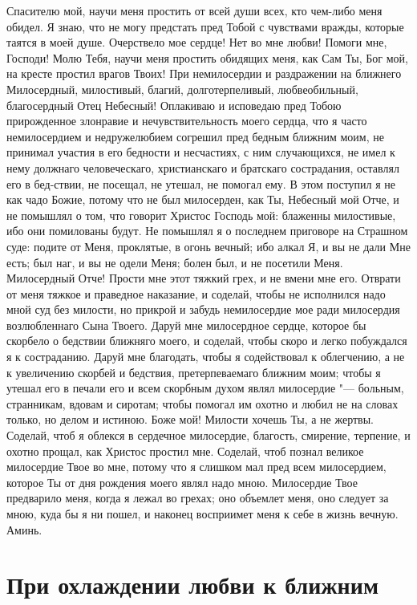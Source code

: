 Спасителю мой, научи меня простить от всей души всех, кто чем-либо меня обидел. Я знаю, что не могу предстать пред Тобой с чувствами вражды, которые таятся в моей душе. Очерствело мое сердце! Нет во мне любви! Помоги мне, Господи! Молю Тебя, научи меня простить обидящих меня, как Сам Ты, Бог мой, на кресте простил врагов Твоих! При немилосердии и раздражении на ближнего Милосердный, милостивый, благий, долготерпеливый, любвеобильный, благосердный Отец Небесный! Оплакиваю и исповедаю пред Тобою прирожденное злонравие и нечувствительность моего сердца, что я часто немилосердием и недружелюбием согрешил пред бедным ближним моим, не принимал участия в его бедности и несчастиях, с ним случающихся, не имел к нему должнаго человеческаго, христианскаго и братскаго сострадания, оставлял его в бед-ствии, не посещал, не утешал, не помогал ему. В этом поступил я не как чадо Божие, потому что не был милосерден, как Ты, Небесный мой Отче, и не помышлял о том, что говорит Христос Господь мой: блаженны милостивые, ибо они помилованы будут. Не помышлял я о последнем приговоре на Страшном суде: подите от Меня, проклятые, в огонь вечный; ибо алкал Я, и вы не дали Мне есть; был наг, и вы не одели Меня; болен был, и не посетили Меня. Милосердный Отче! Прости мне этот тяжкий грех, и не вмени мне его. Отврати от меня тяжкое и праведное наказание, и соделай, чтобы не исполнился надо мной суд без милости, но прикрой и забудь немилосердие мое ради милосердия возлюбленнаго Сына Твоего. Даруй мне милосердное сердце, которое бы скорбело о бедствии ближняго моего, и соделай, чтобы скоро и легко побуждался я к состраданию. Даруй мне благодать, чтобы я содействовал к облегчению, а не к увеличению скорбей и бедствия, претерпеваемаго ближним моим; чтобы я утешал его в печали его и всем скорбным духом являл милосердие "--- больным, странникам, вдовам и сиротам; чтобы помогал им охотно и любил не на словах только, но делом и истиною. Боже мой! Милости хочешь Ты, а не жертвы. Соделай, чтоб я облекся в сердечное милосердие, благость, смирение, терпение, и охотно прощал, как Христос простил мне. Соделай, чтоб познал великое милосердие Твое во мне, потому что я слишком мал пред всем милосердием, которое Ты от дня рождения моего являл надо мною. Милосердие Твое предварило меня, когда я лежал во грехах; оно объемлет меня, оно следует за мною, куда бы я ни пошел, и наконец восприимет меня к себе в жизнь вечную. Аминь. 


\section{При охлаждении любви к ближним}
 


